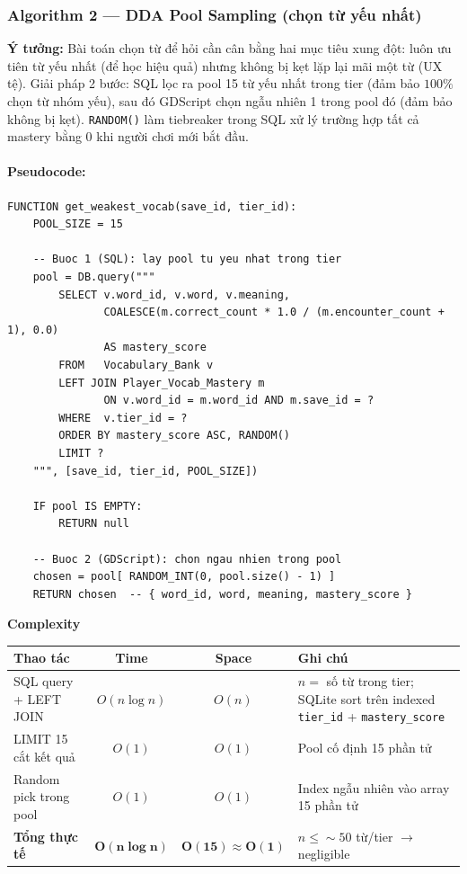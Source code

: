 \subsubsection{Algorithm 2 — DDA Pool Sampling (chọn từ yếu nhất)}
\textbf{Ý tưởng:} Bài toán chọn từ để hỏi cần cân bằng hai mục tiêu xung đột: luôn ưu tiên từ yếu nhất (để học hiệu quả) nhưng không bị kẹt lặp lại mãi một từ (UX tệ). Giải pháp 2 bước: SQL lọc ra pool 15 từ yếu nhất trong tier (đảm bảo $100\%$ chọn từ nhóm yếu), sau đó GDScript chọn ngẫu nhiên 1 trong pool đó (đảm bảo không bị kẹt). \texttt{RANDOM()} làm tiebreaker trong SQL xử lý trường hợp tất cả mastery bằng 0 khi người chơi mới bắt đầu.

\paragraph{Pseudocode:}
\begin{lstlisting}
FUNCTION get_weakest_vocab(save_id, tier_id):
    POOL_SIZE = 15

    -- Buoc 1 (SQL): lay pool tu yeu nhat trong tier
    pool = DB.query("""
        SELECT v.word_id, v.word, v.meaning,
               COALESCE(m.correct_count * 1.0 / (m.encounter_count + 1), 0.0)
               AS mastery_score
        FROM   Vocabulary_Bank v
        LEFT JOIN Player_Vocab_Mastery m
               ON v.word_id = m.word_id AND m.save_id = ?
        WHERE  v.tier_id = ?
        ORDER BY mastery_score ASC, RANDOM()
        LIMIT ?
    """, [save_id, tier_id, POOL_SIZE])

    IF pool IS EMPTY:
        RETURN null

    -- Buoc 2 (GDScript): chon ngau nhien trong pool
    chosen = pool[ RANDOM_INT(0, pool.size() - 1) ]
    RETURN chosen  -- { word_id, word, meaning, mastery_score }
\end{lstlisting}

\textbf{Complexity}
\begin{table}[H]
\centering
\small
\begin{tabularx}{\textwidth}{|l| c| c |X|}
\toprule
\textbf{Thao tác} & \textbf{Time} & \textbf{Space} & \textbf{Ghi chú} \\
\midrule
SQL query + LEFT JOIN & $O(n \log n)$ & $O(n)$ & $n =$ số từ trong tier; SQLite sort trên indexed \texttt{tier\_id} + \texttt{mastery\_score} \\
LIMIT 15 cắt kết quả & $O(1)$ & $O(1)$ & Pool cố định 15 phần tử \\
Random pick trong pool & $O(1)$ & $O(1)$ & Index ngẫu nhiên vào array 15 phần tử \\
\textbf{Tổng thực tế} & $\mathbf{O(n \log n)}$ & $\mathbf{O(15) \approx O(1)}$ & $n \le \sim50$ từ/tier $\rightarrow$ negligible \\
\bottomrule
\end{tabularx}
\end{table}

